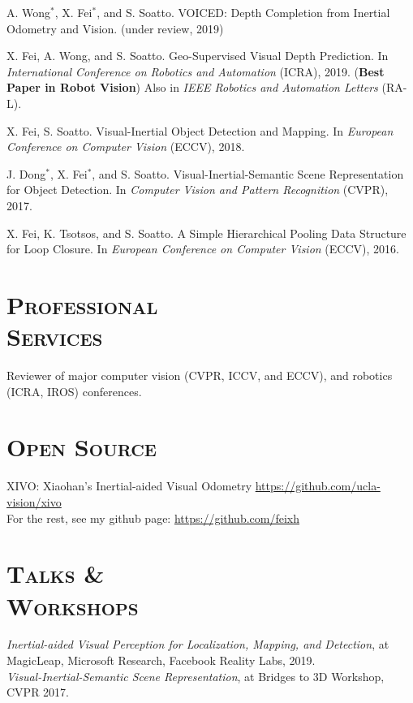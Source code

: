 \documentclass[margin, line, 10pt]{res} %
\begin{document}
\begin{resume}
\begin{enumerate}[label={[\bf\arabic*]},leftmargin=*]
\item
A. Wong$^*$, X. Fei$^*$, and S. Soatto. VOICED: Depth Completion from Inertial Odometry and Vision. (under review, 2019)
\item 
X. Fei, A. Wong, and S. Soatto. Geo-Supervised Visual Depth Prediction. 
In \textit{International Conference on Robotics and Automation} (ICRA), 2019. 
(\textbf{Best Paper in Robot Vision})
Also in \textit{IEEE Robotics and Automation Letters} (RA-L).
\item 
X. Fei, S. Soatto. Visual-Inertial Object Detection and Mapping. 
In \textit{European Conference on Computer Vision} (ECCV), 2018.
\item 
J. Dong$^*$, X. Fei$^*$, and S. Soatto. Visual-Inertial-Semantic Scene Representation for Object Detection. 
In \textit{Computer Vision and Pattern Recognition} (CVPR), 2017.
\item 
X. Fei, K. Tsotsos, and S. Soatto. A Simple Hierarchical Pooling Data Structure for Loop Closure. 
In \textit{European Conference on Computer Vision} (ECCV), 2016.
\end{enumerate}

\section{\textsc{Professional\\Services}}
Reviewer of major computer vision (CVPR, ICCV, and ECCV), and robotics (ICRA, IROS) conferences.

\section{\textsc{Open Source}}
XIVO: Xiaohan's Inertial-aided Visual Odometry \url{https://github.com/ucla-vision/xivo}\\
For the rest, see my github page: \url{https://github.com/feixh}

\section{\textsc{Talks \&\\Workshops}}
\textit{Inertial-aided Visual Perception for Localization, Mapping, and Detection}, at MagicLeap, Microsoft Research, Facebook Reality Labs, 2019.\\
\textit{Visual-Inertial-Semantic Scene Representation}, at Bridges to 3D Workshop, CVPR 2017.


\end{resume}
\end{document}
